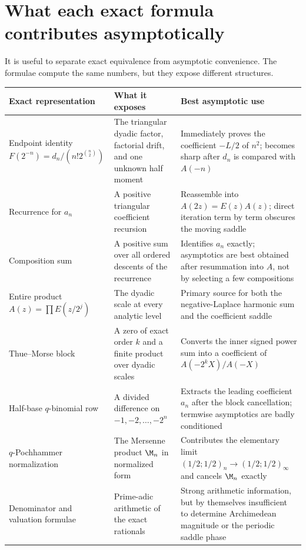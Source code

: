 \documentclass[11pt,oneside]{article}
\theoremstyle{definition}
\theoremstyle{remark}
\begin{document}
\section{What each exact formula contributes asymptotically}
\label{dyadicasym:sec:formula-audit}

It is useful to separate exact equivalence from asymptotic convenience.  The formulae compute
the same numbers, but they expose different structures.

\begingroup\small
\begin{longtable}{@{}
  >{\raggedright\arraybackslash}p{}
  >{\raggedright\arraybackslash}p{}
  >{\raggedright\arraybackslash}p{}@{}}
\toprule
Exact representation & What it exposes & Best asymptotic use\\
\midrule
\endhead
Endpoint identity
$F(2^{-n})=d_n/(n!2^{\binom n2})$ &
The triangular dyadic factor, factorial drift, and one unknown half moment &
Immediately proves the coefficient $-L/2$ of $n^2$; becomes sharp after $d_n$ is compared
with $A(-n)$\\
\addlinespace
Recurrence for $a_n$ &
A positive triangular coefficient recursion &
Reassemble into $A(2z)=E(z)A(z)$; direct iteration term by term obscures the moving saddle\\
\addlinespace
Composition sum &
A positive sum over all ordered descents of the recurrence &
Identifies $a_n$ exactly; asymptotics are best obtained after resummation into $A$, not by
selecting a few compositions\\
\addlinespace
Entire product $A(z)=\prod E(z/2^j)$ &
The dyadic scale at every analytic level &
Primary source for both the negative-Laplace harmonic sum and the coefficient saddle\\
\addlinespace
Thue--Morse block &
A zero of exact order $k$ and a finite product over dyadic scales &
Converts the inner signed power sum into a coefficient of $A(-2^kX)/A(-X)$\\
\addlinespace
Half-base $q$-binomial row &
A divided difference on $-1,-2,\ldots,-2^n$ &
Extracts the leading coefficient $a_n$ after the block cancellation; termwise asymptotics
are badly conditioned\\
\addlinespace
$q$-Pochhammer normalization &
The Mersenne product $\M_n$ in normalized form &
Contributes the elementary limit
$(1/2;1/2)_n\to(1/2;1/2)_\infty$ and cancels $\M_n$ exactly\\
\addlinespace
Denominator and valuation formulae &
Prime-adic arithmetic of the exact rationals &
Strong arithmetic information, but by themselves insufficient to determine Archimedean
magnitude or the periodic saddle phase\\
\bottomrule
\end{longtable}
\endgroup
\end{document}
